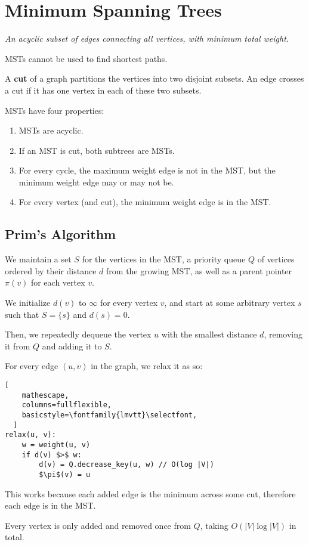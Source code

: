 \section{Minimum Spanning Trees}
\emph{An acyclic subset of edges connecting all vertices, with minimum total weight.}

MSTs cannot be used to find shortest paths.

A \textbf{cut} of a graph partitions the vertices into two disjoint subsets.
An edge crosses a cut if it has one vertex in each of these two subsets.

MSTs have four properties:
\begin{enumerate}
    \item MSTs are acyclic.
    \item If an MST is cut, both subtrees are MSTs.
    \item For every cycle, the maximum weight edge is not in the MST, but the minimum weight edge may or may not be.
    \item For every vertex (and cut), the minimum weight edge is in the MST.
\end{enumerate}

\subsection{Prim's Algorithm}
We maintain a set $S$ for the vertices in the MST,
a priority queue $Q$ of vertices ordered by their distance $d$ from the growing MST,
as well as a parent pointer $\pi(v)$ for each vertex $v$.

We initialize $d(v)$ to $\infty$ for every vertex $v$,
and start at some arbitrary vertex $s$ such that $S = \{s\}$ and $d(s) = 0$.

Then, we repeatedly dequeue the vertex $u$ with the smallest distance $d$,
removing it from $Q$ and adding it to $S$.

For every edge $(u, v)$ in the graph, we relax it as so:
\begin{lstlisting}[
    mathescape,
    columns=fullflexible,
    basicstyle=\fontfamily{lmvtt}\selectfont,
  ]
relax(u, v):
    w = weight(u, v)
    if d(v) $>$ w:
        d(v) = Q.decrease_key(u, w) // O(log |V|)
        $\pi$(v) = u
\end{lstlisting}

This works because each added edge is the minimum across some cut,
therefore each edge is in the MST.

Every vertex is only added and removed once from $Q$, taking $O(|V| \log |V|)$ in total.

